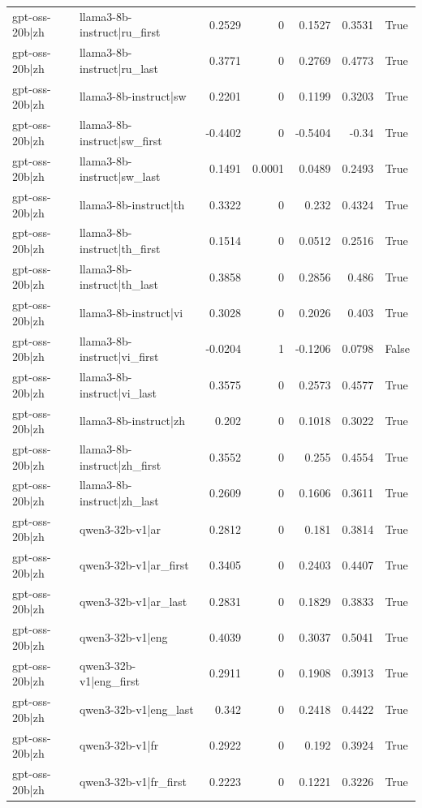 \begin{table}
\begin{tabular}{l l r r r r l}
gpt-oss-20b|zh & llama3-8b-instruct|ru_first & 0.2529 & 0 & 0.1527 & 0.3531 & True \\
gpt-oss-20b|zh & llama3-8b-instruct|ru_last & 0.3771 & 0 & 0.2769 & 0.4773 & True \\
gpt-oss-20b|zh & llama3-8b-instruct|sw & 0.2201 & 0 & 0.1199 & 0.3203 & True \\
gpt-oss-20b|zh & llama3-8b-instruct|sw_first & -0.4402 & 0 & -0.5404 & -0.34 & True \\
gpt-oss-20b|zh & llama3-8b-instruct|sw_last & 0.1491 & 0.0001 & 0.0489 & 0.2493 & True \\
gpt-oss-20b|zh & llama3-8b-instruct|th & 0.3322 & 0 & 0.232 & 0.4324 & True \\
gpt-oss-20b|zh & llama3-8b-instruct|th_first & 0.1514 & 0 & 0.0512 & 0.2516 & True \\
gpt-oss-20b|zh & llama3-8b-instruct|th_last & 0.3858 & 0 & 0.2856 & 0.486 & True \\
gpt-oss-20b|zh & llama3-8b-instruct|vi & 0.3028 & 0 & 0.2026 & 0.403 & True \\
gpt-oss-20b|zh & llama3-8b-instruct|vi_first & -0.0204 & 1 & -0.1206 & 0.0798 & False \\
gpt-oss-20b|zh & llama3-8b-instruct|vi_last & 0.3575 & 0 & 0.2573 & 0.4577 & True \\
gpt-oss-20b|zh & llama3-8b-instruct|zh & 0.202 & 0 & 0.1018 & 0.3022 & True \\
gpt-oss-20b|zh & llama3-8b-instruct|zh_first & 0.3552 & 0 & 0.255 & 0.4554 & True \\
gpt-oss-20b|zh & llama3-8b-instruct|zh_last & 0.2609 & 0 & 0.1606 & 0.3611 & True \\
gpt-oss-20b|zh & qwen3-32b-v1|ar & 0.2812 & 0 & 0.181 & 0.3814 & True \\
gpt-oss-20b|zh & qwen3-32b-v1|ar_first & 0.3405 & 0 & 0.2403 & 0.4407 & True \\
gpt-oss-20b|zh & qwen3-32b-v1|ar_last & 0.2831 & 0 & 0.1829 & 0.3833 & True \\
gpt-oss-20b|zh & qwen3-32b-v1|eng & 0.4039 & 0 & 0.3037 & 0.5041 & True \\
gpt-oss-20b|zh & qwen3-32b-v1|eng_first & 0.2911 & 0 & 0.1908 & 0.3913 & True \\
gpt-oss-20b|zh & qwen3-32b-v1|eng_last & 0.342 & 0 & 0.2418 & 0.4422 & True \\
gpt-oss-20b|zh & qwen3-32b-v1|fr & 0.2922 & 0 & 0.192 & 0.3924 & True \\
gpt-oss-20b|zh & qwen3-32b-v1|fr_first & 0.2223 & 0 & 0.1221 & 0.3226 & True \\

\end{tabular}
\end{table}
